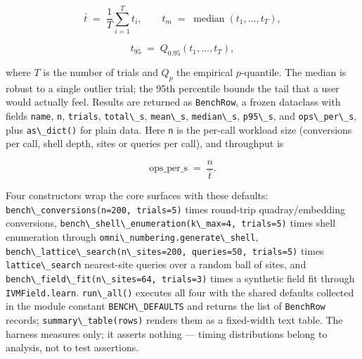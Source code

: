 \documentclass[
  10pt,
]{article}
\newcommand{\passthrough}[1]{#1}
\begin{document}
\begin{equation}
\label{eq:bench-mean}
\bar{t} \;=\; \frac{1}{T}\sum_{i=1}^{T} t_i ,
\qquad t_m \;=\; \operatorname{median}(t_1,\dots,t_T),
\end{equation}

\begin{equation}
\label{eq:bench-percentile}
t_{95} \;=\; Q_{0.95}(t_1,\dots,t_T),
\end{equation}

where \(T\) is the number of trials and \(Q_p\) the empirical
\(p\)-quantile. The median is robust to a single outlier trial; the 95th
percentile bounds the tail that a user would actually feel. Results are
returned as \passthrough{\lstinline!BenchRow!}, a frozen dataclass with
fields \passthrough{\lstinline!name!}, \passthrough{\lstinline!n!},
\passthrough{\lstinline!trials!}, \passthrough{\lstinline!total\_s!},
\passthrough{\lstinline!mean\_s!}, \passthrough{\lstinline!median\_s!},
\passthrough{\lstinline!p95\_s!}, and
\passthrough{\lstinline!ops\_per\_s!}, plus
\passthrough{\lstinline!as\_dict()!} for plain data. Here
\passthrough{\lstinline!n!} is the per-call workload size (conversions
per call, shell depth, sites or queries per call), and throughput is

\begin{equation}
\label{eq:bench-ops}
\text{ops\_per\_s} \;=\; \frac{n}{\bar{t}} .
\end{equation}

Four constructors wrap the core surfaces with these defaults:
\passthrough{\lstinline!bench\_conversions(n=200, trials=5)!} times
round-trip quadray/embedding conversions,
\passthrough{\lstinline!bench\_shell\_enumeration(k\_max=4, trials=5)!}
times shell enumeration through
\passthrough{\lstinline!omni\_numbering.generate\_shell!},
\passthrough{\lstinline!bench\_lattice\_search(n\_sites=200, queries=50, trials=5)!}
times \passthrough{\lstinline!lattice\_search!} nearest-site queries
over a random ball of sites, and
\passthrough{\lstinline!bench\_field\_fit(n\_sites=64, trials=3)!} times
a synthetic field fit through \passthrough{\lstinline!IVMField.learn!}.
\passthrough{\lstinline!run\_all()!} executes all four with the shared
defaults collected in the module constant
\passthrough{\lstinline!BENCH\_DEFAULTS!} and returns the list of
\passthrough{\lstinline!BenchRow!} records;
\passthrough{\lstinline!summary\_table(rows)!} renders them as a
fixed-width text table. The harness measures only; it asserts nothing
--- timing distributions belong to analysis, not to test assertions.
\end{document}
